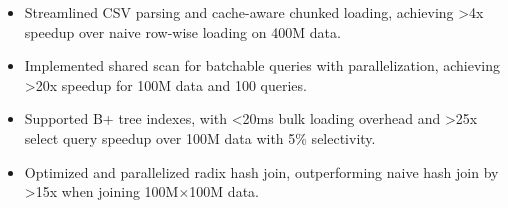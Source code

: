 


\begin{itemize}[nosep]
  \item Streamlined CSV parsing and cache-aware chunked loading, achieving >4x speedup over naive row-wise loading on 400M data.
  \item Implemented shared scan for batchable queries with parallelization, achieving >20x speedup for 100M data and 100 queries.
  \item Supported B+ tree indexes, with <20ms bulk loading overhead and >25x select query speedup over 100M data with 5\% selectivity.
  \item Optimized and parallelized radix hash join, outperforming naive hash join by >15x when joining 100M$\times$100M data.
\end{itemize}
